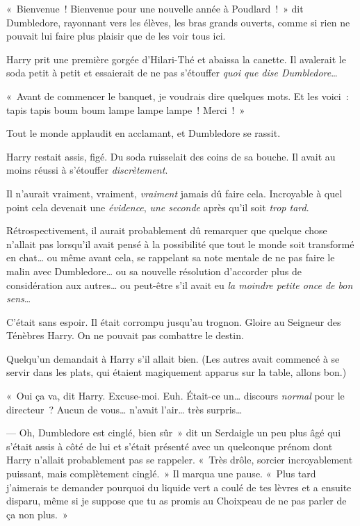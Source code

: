 «~Bienvenue~! Bienvenue pour une nouvelle année à Poudlard~!~» dit Dumbledore, rayonnant vers les élèves, les bras grands ouverts, comme si rien ne pouvait lui faire plus plaisir que de les voir tous ici.

Harry prit une première gorgée d'Hilari-Thé et abaissa la canette.
Il avalerait le soda petit à petit et essaierait de ne pas s'étouffer \emph{quoi que dise Dumbledore}…

«~Avant de commencer le banquet, je voudrais dire quelques mots.
Et les voici~: tapis tapis boum boum lampe lampe lampe~! Merci~!~»

Tout le monde applaudit en acclamant, et Dumbledore se rassit.

Harry restait assis, figé. Du soda ruisselait des coins de sa bouche.
Il avait au moins réussi à s'étouffer \emph{discrètement}.

Il n'aurait vraiment, vraiment, \emph{vraiment} jamais dû faire cela.
Incroyable à quel point cela devenait une \emph{évidence}, \emph{une seconde} après qu'il soit \emph{trop tard}.

Rétrospectivement, il aurait probablement dû remarquer que quelque chose n'allait pas lorsqu'il avait pensé à la possibilité que tout le monde soit transformé en chat… ou même avant cela, se rappelant sa note mentale de ne pas faire le malin avec Dumbledore… ou sa nouvelle résolution d'accorder plus de considération aux autres… ou peut-être s'il avait eu \emph{la moindre petite once de bon sens}…

C'était sans espoir.
Il était corrompu jusqu'au trognon.
Gloire au Seigneur des Ténèbres Harry.
On ne pouvait pas combattre le destin.

Quelqu'un demandait à Harry s'il allait bien.
(Les autres avait commencé à se servir dans les plats, qui étaient magiquement apparus sur la table, allons bon.)

«~Oui ça va, dit Harry. Excuse-moi. Euh. Était-ce un… discours \emph{normal} pour le directeur~?
Aucun de vous… n'avait l'air… très surpris…

--- Oh, Dumbledore est cinglé, bien sûr~» dit un Serdaigle un peu plus âgé qui s'était assis à côté de lui et s'était présenté avec un quelconque prénom dont Harry n'allait probablement pas se rappeler.
«~Très drôle, sorcier incroyablement puissant, mais complètement cinglé.~» 
Il marqua une pause.
«~Plus tard j'aimerais te demander pourquoi du liquide vert a coulé de tes lèvres et a ensuite disparu, même si je suppose que tu as promis au Choixpeau de ne pas parler de ça non plus.~»

